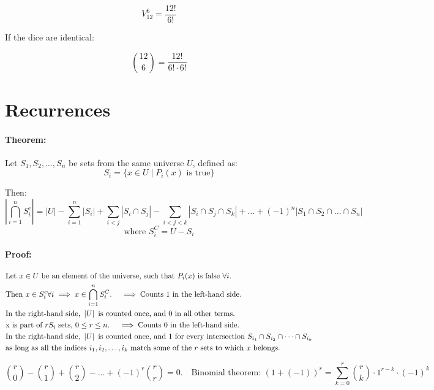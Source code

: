 \documentclass[11pt]{article}
\begin{document}
\[
V_{12}^6 = \frac{12!}{6!}
\]

If the dice are identical:

\[
\binom{12}{6} = \frac{12!}{6!\cdot6!}
\]

\section{Recurrences}
\paragraph{Theorem:}
Let $S_1, S_2, \dots, S_n$ be sets from the same universe $U$, defined as:
\[
S_i = \{x \in U \mid P_i(x) \text{ is true}\}
\]

Then:
\[
\left| \bigcap_{i=1}^{n} S_i^c \right| = \left| U \right| - \sum_{i=1}^{n} \left| S_i \right| + \sum_{i < j} \left| S_i \cap S_j \right| - \sum_{i < j < k} \left| S_i \cap S_j \cap S_k \right| + \dots + (-1)^n \left| S_1 \cap S_2 \cap \dots \cap S_n \right|
\]
\[
\text{where } S_i^C = U - S_i
\]

\paragraph{Proof:}
\begin{align*}
    &\text{Let } x \in U \text{ be an element of the universe, such that } P_i(x) \text{ is false } \forall i. \\
    &\text{Then } x \in S_i^c \forall i \implies x \in \bigcap_{i=1}^{n} S_i^C. \quad \implies \text{Counts 1 in the left-hand side.} \\
    &\text{In the right-hand side, } \left| U \right| \text{ is counted once, and 0 in all other terms.} \\
    &\text{x is part of } r \space S_i \text{ sets, } 0 \leq r \leq n. \quad \implies \text{Counts 0 in the left-hand side.} \\
    &\text{In the right-hand side, } \left| U \right| \text{ is counted once, and 1 for every intersection } S_{i_1} \cap S_{i_2} \cap \dots \cap S_{i_k} \\
    &\text{as long as all the indices } i_1, i_2, \dots, i_k \text{ match some of the } r \text{ sets to which } x \text{ belongs.} \\
\end{align*}

\[
\binom{r}{0} - \binom{r}{1} + \binom{r}{2} - \dots + (-1)^r \binom{r}{r} = 0. \quad \text{Binomial theorem: } (1 + (-1))^r = \sum_{k=0}^{r} \binom{r}{k} \cdot 1^{r-k} \cdot (-1)^k 
\]
\end{document}
